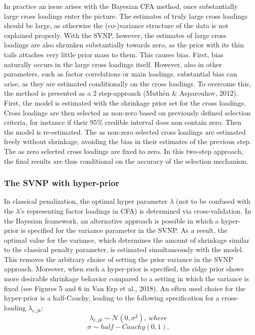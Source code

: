 \documentclass[
  man, donotrepeattitle,floatsintext]{apa6}
\begin{document}
In practice an issue arises with the Bayesian CFA method, once
substantially large cross loadings enter the picture. The estimates of
truly large cross loadings should be large, as otherwise the
(co-)variance structure of the data is not explained properly. With the
SVNP, however, the estimates of large cross loadings are also shrunken
substantially towards zero, as the prior with its thin tails attaches
very little prior mass to them. This causes bias. First, bias naturally
occurs in the large cross loadings itself. However, also in other
parameters, such as factor correlations or main loadings, substantial
bias can arise, as they are estimated conditionally on the cross
loadings. To overcome this, the method is presented as a 2 step-approach
(Muthén \& Asparouhov, 2012). First, the model is estimated with the
shrinkage prior set for the cross loadings. Cross loadings are then
selected as non-zero based on previously defined selection criteria, for
instance if their 95\% credible interval does non contain zero. Then the
model is re-estimated. The as non-zero selected cross loadings are
estimated freely without shrinkage, avoiding the bias in their estimates
of the previous step. The as zero selected cross loadings are fixed to
zero. In this two-step approach, the final results are thus conditional
on the accuracy of the selection mechanism.

\subsubsection{The SVNP with hyper-prior}\label{the-svnp-with-hyper-prior}

In classical penalization, the optimal hyper parameter \(\lambda\) (not to be confused with the \(\lambda\)'s representing factor loadings in CFA) is determined via cross-validation. In the Bayesian framework, an alternative approach is possible in which a hyper-prior is specified for the variance parameter in the SVNP. As a result, the optimal value for the variance, which determines the amount of shrinkage similar to the classical penalty parameter, is estimated simultaneously with the model. This removes the arbitrary choice of setting the prior variance in the SVNP approach. Moreover, when such a hyper-prior is specified, the ridge prior shows more desirable shrinkage behavior compared to a setting in which the variance is fixed (see Figures 5 and 6 in Van Erp et al., 2018). An often used choice for the hyper-prior is a half-Cauchy, leading to the following specification for a cross-loading \(\lambda_{c,jk}\):
\[\lambda_{c,jk}  \sim \mathcal{N}(0, \sigma^2), \ where\]
\[ \sigma \sim half-Cauchy(0, 1).\]
\end{document}
